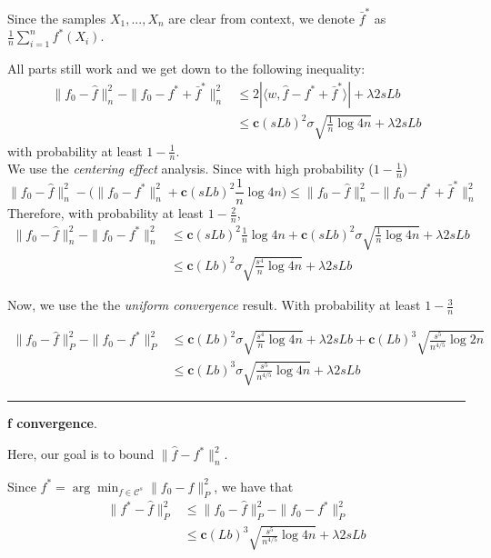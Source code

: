 \documentclass{article}
\begin{document}
{Since the samples $X_1, ..., X_n$ are clear from context, we denote $\bar{f}^*$ as $\frac{1}{n} \sum_{i=1}^n f^*(X_i)$. 

All parts still work and we get down to the following inequality:
\begin{align*}
\| f_0 - \hat{f} \|_n^2 - \|f_0 - f^* + \bar{f}^* \|_n^2 &\leq 
      2 | \langle w, \hat{f} - f^* + \bar{f}^* \rangle | + \lambda 2sLb \\
  &\leq \mathbf{c} (sLb)^2 \sigma \sqrt{ \frac{1}{n} \log 4n } + 
   \lambda 2 s L b
\end{align*}
with probability at least $1-\frac{1}{n}$.\\


We use the \emph{centering effect} analysis. Since with high probability ($1-\frac{1}{n}$) 
\[
\|f_0 - \hat{f}\|_n^2 - 
  \Big( \|f_0 - f^*\|_n^2 + \mathbf{c} (sLb)^2 \frac{1}{n} \log 4n \Big) \leq 
\|f_0 - \hat{f} \|_n^2 - \|f_0 - f^* + \bar{f}^*\|_n^2
\]
Therefore, with probability at least $1-\frac{2}{n}$,
\begin{align*}
\|f_0 - \hat{f}\|_n^2 - \|f_0 -f^*\|_n^2 &\leq \mathbf{c}(sLb)^2 \frac{1}{n} \log 4n
      + \mathbf{c} (sLb)^2 \sigma \sqrt{\frac{1}{n} \log 4n } + \lambda 2 sLb \\
 &\leq \mathbf{c} (Lb)^2\sigma \sqrt{\frac{s^4}{n} \log 4n} + \lambda 2 sLb
\end{align*}


Now, we use the the \emph{uniform convergence} result. With probability at least $1-\frac{3}{n}$

\begin{align*}
\| f_0 - \hat{f}\|_P^2 - \| f_0 - f^*\|_P^2 & \leq
   \mathbf{c} (Lb)^2 \sigma \sqrt{\frac{s^4}{n} \log 4n} + \lambda 2 s Lb +
   \mathbf{c} (Lb)^3 \sqrt{\frac{s^5}{n^{4/5}} \log 2n} \\
 &\leq \mathbf{c} (Lb)^3 \sigma \sqrt{ \frac{s^5}{n^{4/5}} \log 4n} + \lambda 2 s Lb
\end{align*}


\rule{5cm}{0.4pt}
\vspace{0.2in}

\textbf{f convergence}.

Here, our goal is to bound $\| \hat{f} - f^* \|_n^2$.

Since $f^* = \arg\min_{f \in \mathcal{C}^s} \| f_0 - f \|_P^2$, we have that
\begin{align*}
\|f^* - \hat{f} \|_P^2 &\leq \|f_0 - \hat{f} \|_P^2 - \| f_0 - f^* \|_P^2 \\
 &\leq \mathbf{c} (Lb)^3 \sqrt{ \frac{s^5}{n^{4/5}} \log 4n} + \lambda 2s Lb
\end{align*}

}
\end{document}
